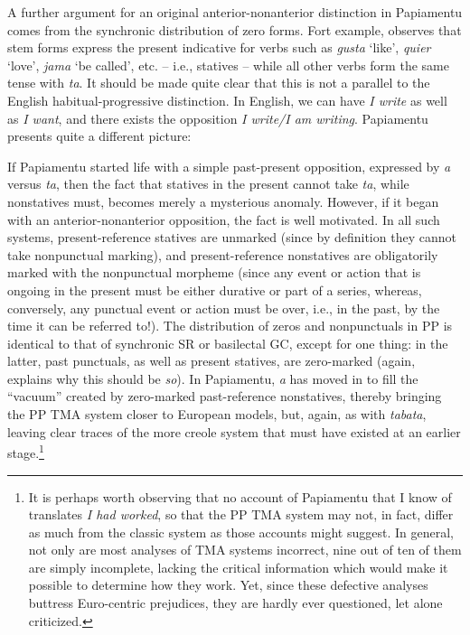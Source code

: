 A further argument for an original anterior-nonanterior distinc\-tion in Papiamentu comes from the synchronic distribution of zero forms. Fort example, \citet[107]{Goilo1953} observes that stem forms express the present indicative for verbs such as \textit{gusta} `like', \textit{quier} `love', \textit{jama} `be called', etc. -- i.e., statives -- while all other verbs form the same tense with \textit{ta}. It should be made quite clear that this is not a parallel to the English habitual-progressive distinction. In English, we can have \textit{I write} as well as \textit{I want}, and there exists the opposition \textit{I write/I am writing}. Papiamentu presents quite a different picture:

\z
{}

\z

\z

\label{ex:2:102}\z

If Papiamentu started life with a simple past-present opposition,
expressed by \textit{a} versus \textit{ta}, then the fact that statives in the present cannot take \textit{ta}, while nonstatives must, becomes merely a mysterious anomaly. However, if it began with an anterior-nonanterior opposition, the fact is well motivated. In all such systems, present-reference statives are unmarked (since by definition they cannot take nonpunctual mark\-ing), and present-reference nonstatives are obligatorily marked with the nonpunctual morpheme (since any event or action that is ongoing in the present must be either durative or part of a series, whereas, con\-versely, any punctual event or action must be over, i.e., in the past, by the time it can be referred to!). The distribution of zeros and nonpunctuals in PP is identical to that of synchronic SR or basilectal GC, except for one thing: in the latter, past punctuals, as well as present statives, are zero-marked (again, \citet[Chapter 2]{Bickerton1975} explains why this should be \textit{so}). In Papiamentu, \textit{a} has moved in to fill the ``vacuum'' created by zero-marked past-reference nonstatives, thereby bringing the PP TMA system closer to European models, but, again, as with \textit{tabata}, leaving clear traces of the more creole system that must have existed at an earlier stage.\footnote{It is perhaps worth observing that no account of Papiamentu that I know of translates \textit{I had worked}, so that the PP TMA system may not, in fact, differ as much from the classic system as those ac\-counts might suggest. In general, not only are most analyses of TMA systems incorrect, nine out of ten of them are simply incomplete, lacking the critical information which would make it possible to deter\-mine how they work. Yet, since these defective analyses buttress Euro-centric prejudices, they are hardly ever questioned, let alone criticized.}

